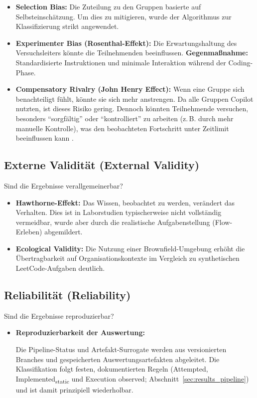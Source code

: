 \begin{itemize}
  \item {\bfseries Selection Bias:} Die Zuteilung zu den Gruppen basierte auf Selbsteinschätzung. Um dies zu mitigieren, wurde der Algorithmus zur Klassifizierung strikt angewendet.
  \item {\bfseries Experimenter Bias (Rosenthal-Effekt):} Die Erwartungshaltung des Versuchsleiters könnte die Teilnehmenden beeinflussen. {\bfseries Gegenmaßnahme:} Standardisierte Instruktionen und minimale Interaktion während der Coding-Phase.
  \item {\bfseries Compensatory Rivalry (John Henry Effect):} Wenn eine Gruppe sich benachteiligt fühlt, könnte sie sich mehr anstrengen. Da alle Gruppen Copilot nutzten, ist dieses Risiko gering. Dennoch könnten Teilnehmende versuchen, besonders \enquote{sorgfältig} oder \enquote{kontrolliert} zu arbeiten (z.\,B. durch mehr manuelle Kontrolle), was den beobachteten Fortschritt unter Zeitlimit beeinflussen kann \parencite{saretsky1972johnhenry}.
\end{itemize}

\subsection{Externe Validität (External Validity)}
Sind die Ergebnisse verallgemeinerbar?

\begin{itemize}
  \item {\bfseries Hawthorne-Effekt:} Das Wissen, beobachtet zu werden, verändert das Verhalten. Dies ist in Laborstudien typischerweise nicht vollständig vermeidbar, wurde aber durch die realistische Aufgabenstellung (Flow-Erleben) abgemildert.
  \item {\bfseries Ecological Validity:} Die Nutzung einer Brownfield-Umgebung erhöht die Übertragbarkeit auf Organisationskontexte im Vergleich zu synthetischen LeetCode-Aufgaben deutlich.
\end{itemize}

\subsection{Reliabilität (Reliability)}
Sind die Ergebnisse reproduzierbar?

\begin{itemize}
  \item {\bfseries Reproduzierbarkeit der Auswertung:}\par
  Die Pipeline-Status und Artefakt-Surrogate werden aus versionierten Branches und gespeicherten Auswertungsartefakten abgeleitet. Die Klassifikation folgt festen, dokumentierten Regeln (Attempted, Implemented\textsubscript{static} und Execution observed; Abschnitt~\ref{sec:results_pipeline}) und ist damit prinzipiell wiederholbar.
\end{itemize}


